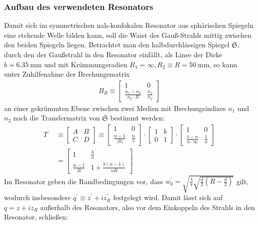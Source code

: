 \documentclass[11pt,a4paper,oneside]{scrartcl}
\begin{document}
\subsubsection{Aufbau des verwendeten Resonators}
\setcounter{figure}{3}
Damit sich im symmetrischen nah-konfokalen Resonator aus sphärischen Spiegeln eine stehende Welle bilden kann, soll die Waist des Gauß-Strahls mittig zwischen den beiden Spiegeln liegen. Betrachtet man den halbdurchlässigen Spiegel $\mathfrak{S}$, durch den der Gaußstrahl in den Resonator einfällt, als Linse der Dicke $b=6.35\ \mathrm{mm}$ und mit Krümmungsradien $R_1=\infty,R_2\equiv R=50\ \mathrm{mm}$, so kann unter Zuhilfenahme der Brechungsmatrix 
\begin{align}
B_R\equiv \begin{bmatrix}
1 & 0\\
\frac{n_1-n_2}{n_2\cdot R} & \frac{n_1}{n_2}
\end{bmatrix} 
\end{align}
an einer gekrümmten Ebene zwischen zwei Medien mit Brechungsindizes $n_1$ und $n_2$
nach \cite{dewiki:225621757} die Transfermatrix von $\mathfrak{S}$ bestimmt werden:
\begin{align}
T & \equiv
\begin{bmatrix}
A & B\\
C & D 
\end{bmatrix} 
\equiv
\begin{bmatrix}
1 & 0\\
\frac{n-1}{|R|} & \frac{n}{1}
\end{bmatrix} 
\cdot
\begin{bmatrix}
1 & b\\
0 & 1
\end{bmatrix} 
\cdot
\begin{bmatrix}
1 & 0\\
\frac{1-n}{n\cdot \infty} & \frac{1}{n}
\end{bmatrix} 
\\ \quad& = \begin{bmatrix}
1 & \frac{b}{n}\\
\frac{n-1}{R} & 1+\frac{b(n-1)}{nR}
\end{bmatrix}
\end{align}
Im Resonator geben die Randbedingungen vor, dass $w_0^\prime=\sqrt{\frac{\lambda}{\pi}\sqrt{\frac{d}{2}\left(R-\frac{d}{2}\right)}}$ gilt, wodurch insbesondere $q^\prime\equiv z^\prime+iz_R^\prime$ festgelegt wird. Damit lässt sich auf $q=z+iz_R$ außerhalb des Resonators, also vor dem Einkoppeln des Strahls in den Resonator, schließen:
\end{document}
